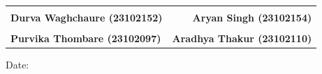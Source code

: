 \documentclass[12pt,a4paper]{report}
\begin{document}
\vspace{2.0cm}
\noindent
\begin{tabular*}{\textwidth}{@{\extracolsep{\fill}}lr}
    \underline{\hspace{5.5cm}} & \underline{\hspace{5.5cm}} \\
    \textbf{Durva Waghchaure (23102152)} & \textbf{Aryan Singh (23102154)} \\[2.0cm]
    \underline{\hspace{5.5cm}} & \underline{\hspace{5.5cm}} \\
    \textbf{Purvika Thombare (23102097)} & \textbf{Aradhya Thakur (23102110)} \\
\end{tabular*}

\vspace{1.8cm}
\noindent Date: \underline{\hspace{3.5cm}}
\end{document}
